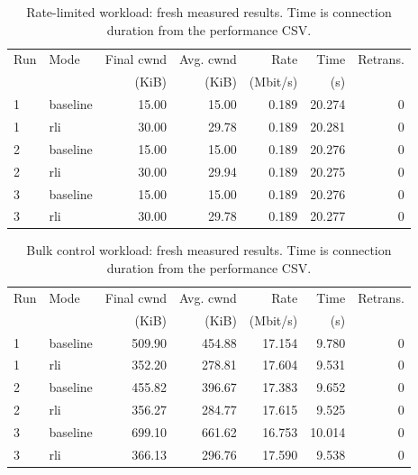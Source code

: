 \begin{table}[H]\centering\small
\begin{tabular}{llrrrrr}\toprule
Run & Mode & Final cwnd & Avg. cwnd & Rate & Time & Retrans.\\
 & & (KiB) & (KiB) & (Mbit/s) & (s) & \\\midrule
1 & baseline & 15.00 & 15.00 & 0.189 & 20.274 & 0 \\
1 & rli & 30.00 & 29.78 & 0.189 & 20.281 & 0 \\
2 & baseline & 15.00 & 15.00 & 0.189 & 20.276 & 0 \\
2 & rli & 30.00 & 29.94 & 0.189 & 20.275 & 0 \\
3 & baseline & 15.00 & 15.00 & 0.189 & 20.276 & 0 \\
3 & rli & 30.00 & 29.78 & 0.189 & 20.277 & 0 \\
\bottomrule\end{tabular}
\caption{Rate-limited workload: fresh measured results. Time is connection duration from the performance CSV.}\end{table}
\begin{table}[H]\centering\small
\begin{tabular}{llrrrrr}\toprule
Run & Mode & Final cwnd & Avg. cwnd & Rate & Time & Retrans.\\
 & & (KiB) & (KiB) & (Mbit/s) & (s) & \\\midrule
1 & baseline & 509.90 & 454.88 & 17.154 & 9.780 & 0 \\
1 & rli & 352.20 & 278.81 & 17.604 & 9.531 & 0 \\
2 & baseline & 455.82 & 396.67 & 17.383 & 9.652 & 0 \\
2 & rli & 356.27 & 284.77 & 17.615 & 9.525 & 0 \\
3 & baseline & 699.10 & 661.62 & 16.753 & 10.014 & 0 \\
3 & rli & 366.13 & 296.76 & 17.590 & 9.538 & 0 \\
\bottomrule\end{tabular}
\caption{Bulk control workload: fresh measured results. Time is connection duration from the performance CSV.}\end{table}
